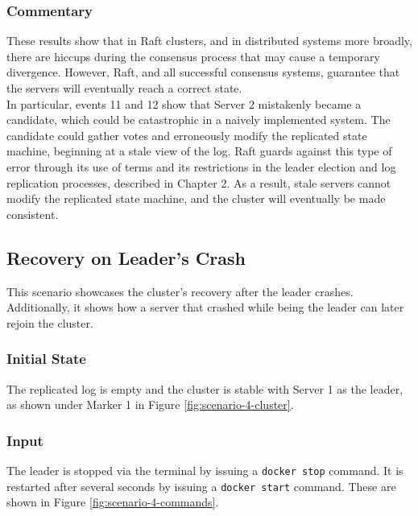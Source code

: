 \subsubsection{Commentary}

These results show that in Raft clusters, and in distributed systems more broadly, there are hiccups during the consensus process that may cause a temporary divergence. However, Raft, and all successful consensus systems, guarantee that the servers will eventually reach a correct state.\\

In particular, events 11 and 12 show that Server 2 mistakenly became a candidate, which could be catastrophic in a naively implemented system. The candidate could gather votes and erroneously modify the replicated state machine, beginning at a stale view of the log. Raft guards against this type of error through its use of terms and its restrictions in the leader election and log replication processes, described in Chapter 2. As a result, stale servers cannot modify the replicated state machine, and the cluster will eventually be made consistent.

\subsection{Recovery on Leader's Crash}

This scenario showcases the cluster's recovery after the leader crashes. Additionally, it shows how a server that crashed while being the leader can later rejoin the cluster.

\subsubsection{Initial State}

The replicated log is empty and the cluster is stable with Server 1 as the leader, as shown under Marker
1 in Figure \ref{fig:scenario-4-cluster}.

\subsubsection{Input}

The leader is stopped via the terminal by issuing a \lstinline|docker stop| command. It is restarted after several seconds by issuing a \lstinline|docker start| command. These are shown in Figure \ref{fig:scenario-4-commands}.

